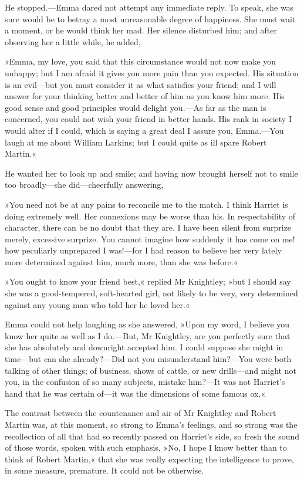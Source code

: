 He stopped.—Emma dared not attempt any immediate reply. To speak, she was sure would be to betray a most unreasonable degree of happiness. She must wait a moment, or he would think her mad. Her silence disturbed him; and after observing her a little while, he added,

»Emma, my love, you said that this circumstance would not now make you unhappy; but I am afraid it gives you more pain than you expected. His situation is an evil—but you must consider it as what satisfies your friend; and I will answer for your thinking better and better of him as you know him more. His good sense and good principles would delight you.—As far as the man is concerned, you could not wish your friend in better hands. His rank in society I would alter if I could, which is saying a great deal I assure you, Emma.—You laugh at me about William Larkins; but I could quite as ill spare Robert Martin.«

He wanted her to look up and smile; and having now brought herself not to smile too broadly—she did—cheerfully answering,

»You need not be at any pains to reconcile me to the match. I think Harriet is doing extremely well. Her connexions may be worse than his. In respectability of character, there can be no doubt that they are. I have been silent from surprize merely, excessive surprize. You cannot imagine how suddenly it has come on me! how peculiarly unprepared I was!—for I had reason to believe her very lately more determined against him, much more, than she was before.«

»You ought to know your friend best,« replied Mr Knightley; »but I should say she was a good-tempered, soft-hearted girl, not likely to be very, very determined against any young man who told her he loved her.«

Emma could not help laughing as she answered, »Upon my word, I believe you know her quite as well as I do.—But, Mr Knightley, are you perfectly sure that she has absolutely and downright accepted him. I could suppose she might in time—but can she already?—Did not you misunderstand him?—You were both talking of other things; of business, shows of cattle, or new drills—and might not you, in the confusion of so many subjects, mistake him?—It was not Harriet's hand that he was certain of—it was the dimensions of some famous ox.«

The contrast between the countenance and air of Mr Knightley and Robert Martin was, at this moment, so strong to Emma's feelings, and so strong was the recollection of all that had so recently passed on Harriet's side, so fresh the sound of those words, spoken with such emphasis, »No, I hope I know better than to think of Robert Martin,« that she was really expecting the intelligence to prove, in some measure, premature. It could not be otherwise.

